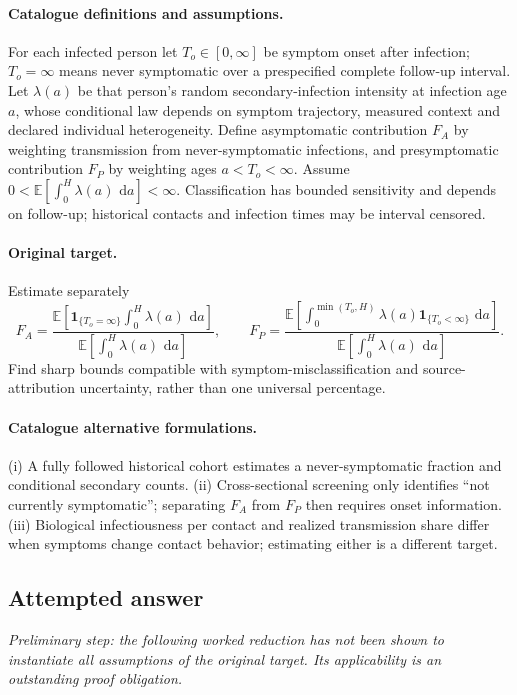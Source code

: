 \documentclass[11pt]{article}
\begin{document}
\paragraph{Catalogue definitions and assumptions.}
For each infected person let $T_o\in[0,\infty]$ be symptom onset after infection; $T_o=\infty$ means never symptomatic over a prespecified complete follow-up interval. Let $\lambda(a)$ be that person's random secondary-infection intensity at infection age $a$, whose conditional law depends on symptom trajectory, measured context and declared individual heterogeneity. Define asymptomatic contribution $F_A$ by weighting transmission from never-symptomatic infections, and presymptomatic contribution $F_P$ by weighting ages $a<T_o<\infty$. Assume $0<\mathbb{E}[\int_0^H\lambda(a)\,\,\mathrm{d} a]<\infty$. Classification has bounded sensitivity and depends on follow-up; historical contacts and infection times may be interval censored.
\paragraph{Original target.}
Estimate separately
    \[F_A=\frac{\mathbb{E}\!\left[\mathbf1_{\{T_o=\infty\}}\int_0^H\lambda(a)\,\,\mathrm{d} a\right]}{\mathbb{E}\!\left[\int_0^H\lambda(a)\,\,\mathrm{d} a\right]},\qquad
    F_P=\frac{\mathbb{E}\!\left[\int_0^{\min(T_o,H)}\lambda(a)\mathbf1_{\{T_o<\infty\}}\,\,\mathrm{d} a\right]}{\mathbb{E}\!\left[\int_0^H\lambda(a)\,\,\mathrm{d} a\right]}.\]
    Find sharp bounds compatible with symptom-misclassification and source-attribution uncertainty, rather than one universal percentage.
\paragraph{Catalogue alternative formulations.}
(i) A fully followed historical cohort estimates a never-symptomatic fraction and conditional secondary counts. (ii) Cross-sectional screening only identifies ``not currently symptomatic''; separating $F_A$ from $F_P$ then requires onset information. (iii) Biological infectiousness per contact and realized transmission share differ when symptoms change contact behavior; estimating either is a different target.
\subsection{Attempted answer}
\noindent\emph{Preliminary step: the following worked reduction has not been shown to instantiate all assumptions of the original target. Its applicability is an outstanding proof obligation.}
\end{document}
